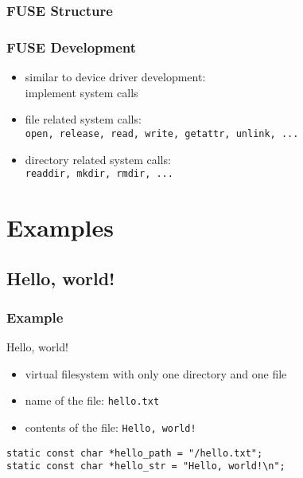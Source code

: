 \documentclass[dvipsnames]{beamer}
\begin{document}
\begin{frame}
  \frametitle{FUSE Structure}

  \begin{center}
  \end{center}
\end{frame}

\begin{frame}
  \frametitle{FUSE Development}

  \begin{itemize}
    \item similar to device driver development:\\
      implement system calls

    \bigskip
    \item file related system calls:\\
      \lstinline|open, release, read, write, getattr, unlink, ...|
    \item directory related system calls:\\
      \lstinline|readdir, mkdir, rmdir, ...|
  \end{itemize}
\end{frame}

\section{Examples}

\subsection{Hello, world!}

\begin{frame}[fragile]
  \frametitle{Example}

  \begin{exampleblock}{Hello, world!}
    \begin{itemize}
      \item virtual filesystem with only one directory and one file
      \item name of the file: \texttt{hello.txt}
      \item contents of the file: \lstinline|Hello, world!|
    \end{itemize}

    \begin{lstlisting}
static const char *hello_path = "/hello.txt";
static const char *hello_str = "Hello, world!\n";
    \end{lstlisting}
  \end{exampleblock}
\end{frame}
\end{document}
